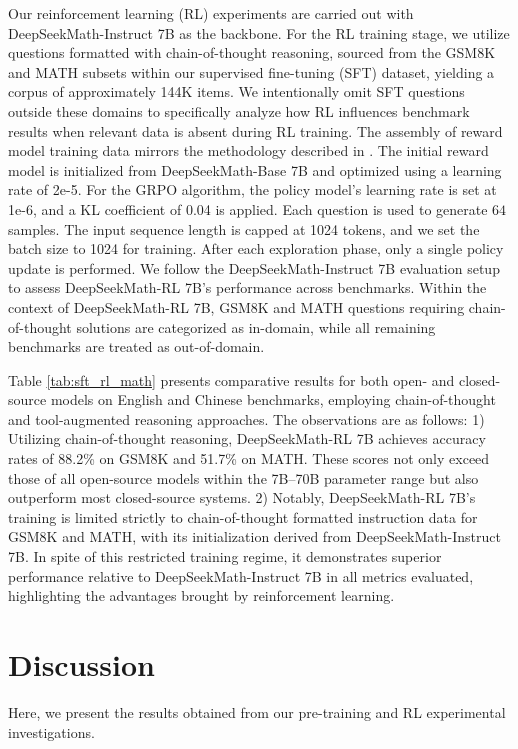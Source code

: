\begin{itemize}[topsep=0pt]
\begin{itemize}[topsep=0pt]
Our reinforcement learning (RL) experiments are carried out with DeepSeekMath-Instruct 7B as the backbone. For the RL training stage, we utilize questions formatted with chain-of-thought reasoning, sourced from the GSM8K and MATH subsets within our supervised fine-tuning (SFT) dataset, yielding a corpus of approximately 144K items. We intentionally omit SFT questions outside these domains to specifically analyze how RL influences benchmark results when relevant data is absent during RL training. The assembly of reward model training data mirrors the methodology described in \citep{wang2023math}. The initial reward model is initialized from DeepSeekMath-Base 7B and optimized using a learning rate of 2e-5. For the GRPO algorithm, the policy model’s learning rate is set at 1e-6, and a KL coefficient of 0.04 is applied. Each question is used to generate $64$ samples. The input sequence length is capped at 1024 tokens, and we set the batch size to 1024 for training. After each exploration phase, only a single policy update is performed. We follow the DeepSeekMath-Instruct 7B evaluation setup to assess DeepSeekMath-RL 7B’s performance across benchmarks. Within the context of DeepSeekMath-RL 7B, GSM8K and MATH questions requiring chain-of-thought solutions are categorized as in-domain, while all remaining benchmarks are treated as out-of-domain.

Table \ref{tab:sft_rl_math} presents comparative results for both open- and closed-source models on English and Chinese benchmarks, employing chain-of-thought and tool-augmented reasoning approaches. The observations are as follows: 1) Utilizing chain-of-thought reasoning, DeepSeekMath-RL 7B achieves accuracy rates of 88.2\% on GSM8K and 51.7\% on MATH. These scores not only exceed those of all open-source models within the 7B–70B parameter range but also outperform most closed-source systems. 2) Notably, DeepSeekMath-RL 7B’s training is limited strictly to chain-of-thought formatted instruction data for GSM8K and MATH, with its initialization derived from DeepSeekMath-Instruct 7B. In spite of this restricted training regime, it demonstrates superior performance relative to DeepSeekMath-Instruct 7B in all metrics evaluated, highlighting the advantages brought by reinforcement learning.

\section{Discussion}
Here, we present the results obtained from our pre-training and RL experimental investigations.


\end{itemize}
\end{itemize}

